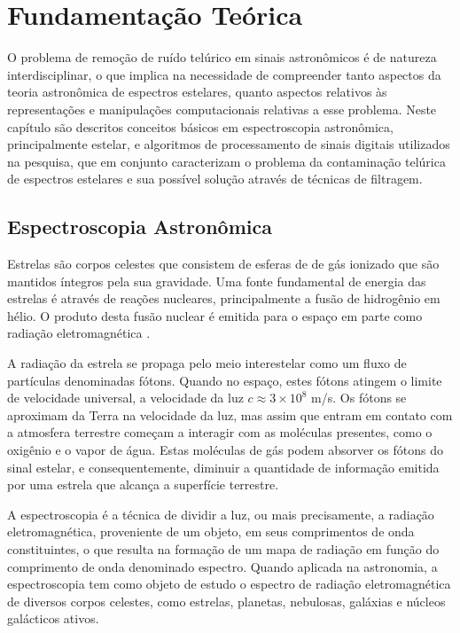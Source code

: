 \chapter{Fundamentação Teórica}
\label{cap:fundamentacao-teorica}

O problema de remoção de ruído telúrico em sinais astronômicos é de natureza interdisciplinar, o que implica na necessidade de compreender tanto aspectos da teoria astronômica de espectros estelares, quanto aspectos relativos às representações e manipulações computacionais relativas a esse problema.
Neste capítulo são descritos conceitos básicos em espectroscopia astronômica, principalmente estelar, e algoritmos de processamento de sinais digitais utilizados na pesquisa, que em conjunto caracterizam o problema da contaminação telúrica de espectros estelares e sua possível solução através de técnicas de filtragem.

\section{Espectroscopia Astronômica} \label{astronomic-spectroscopy}

Estrelas são corpos celestes que consistem de esferas de de gás ionizado que são mantidos íntegros pela sua gravidade. Uma fonte fundamental de energia das estrelas é através de reações nucleares, principalmente a fusão de hidrogênio em hélio. O produto desta fusão nuclear é emitida para o espaço em parte como radiação eletromagnética \citep{estrelas-ufrgs}.       

A radiação da estrela se propaga pelo meio interestelar como um fluxo de partículas denominadas fótons. Quando no espaço, estes fótons atingem o limite de velocidade universal, a velocidade da luz $\textit{c} \approx 3 \times 10^8$ m/s. Os fótons se aproximam da Terra na velocidade da luz, mas assim que entram em contato com a atmosfera terrestre começam a interagir com as moléculas presentes, como o oxigênio e o vapor de água. Estas moléculas de gás podem absorver os fótons do sinal estelar, e consequentemente, diminuir a quantidade de informação emitida por uma estrela que alcança a superfície terrestre.  

A espectroscopia é a técnica de dividir a luz, ou mais precisamente, a radiação eletromagnética, proveniente de um objeto, em seus comprimentos de onda constituintes, o que resulta na formação de um mapa de radiação em função do comprimento de onda denominado espectro. Quando aplicada na astronomia, a espectroscopia tem como objeto de estudo o espectro de radiação eletromagnética de diversos corpos celestes, como estrelas, planetas, nebulosas, galáxias e núcleos galácticos ativos.

